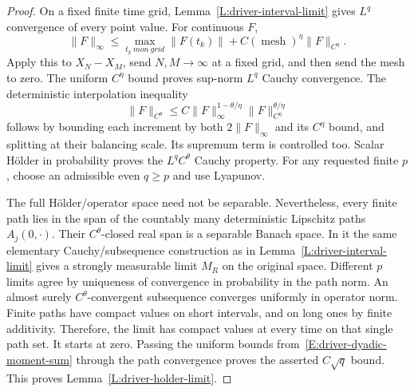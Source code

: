 \begin{proof}
  On a fixed finite time grid, Lemma~\ref{L:driver-interval-limit} gives
  $L^q$ convergence of every point value. For continuous $F$,
  \[
    \|F\|_\infty\le\max_{t_k\ {
    m on\ grid}}\|F(t_k)\|
    +C(\operatorname{mesh})^\eta\|F\|_{C^\eta}.
  \]
  Apply this to $X_N-X_M$, send $N,M\to\infty$ at a fixed grid, and
  then send the mesh to zero. The uniform $C^\eta$ bound proves sup-norm
  $L^q$ Cauchy convergence. The deterministic interpolation inequality
  \begin{equation}\label{E:driver-holder-interpolation}
    \|F\|_{C^\theta}
    \le C\|F\|_\infty^{1-\theta/\eta}
    \|F\|_{C^\eta}^{\theta/\eta}
  \end{equation}
  follows by bounding each increment by both $2\|F\|_\infty$ and its
  $C^\eta$ bound, and splitting at their balancing scale. Its supremum
  term is controlled too. Scalar H\"older in probability proves the
  $L^qC^\theta$ Cauchy property. For any requested finite $p$, choose an
  admissible even $q\ge p$ and use Lyapunov.

  The full H\"older/operator space need not be separable. Nevertheless,
  every finite path lies in the span of the countably many deterministic
  Lipschitz paths $A_j(0,\cdot)$. Their $C^\theta$-closed real span is a
  separable Banach space. In it the same elementary Cauchy/subsequence
  construction as in Lemma~\ref{L:driver-interval-limit} gives a strongly
  measurable limit $M_R$ on the original space. Different $p$ limits agree
  by uniqueness of convergence in probability in the path norm. An almost
  surely $C^\theta$-convergent subsequence converges uniformly in operator
  norm. Finite paths have compact values on short intervals, and on long
  ones by finite additivity. Therefore, the limit has compact values at
  every time on that single path set. It starts at zero. Passing the
  uniform bounds from~\eqref{E:driver-dyadic-moment-sum} through the path
  convergence proves the asserted $C\sqrt q$ bound.
  This proves Lemma~\ref{L:driver-holder-limit}.
\end{proof}

